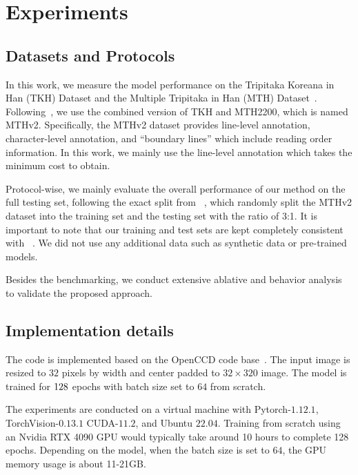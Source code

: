
\section{Experiments}

\subsection{Datasets and Protocols}
In this work, we measure the model performance on the Tripitaka Koreana in Han (TKH) Dataset and the Multiple Tripitaka in Han (MTH) Dataset~\cite{tkhmth}. Following~\cite{jla},
we use the combined version of TKH and MTH2200, which is named MTHv2. Specifically, the MTHv2 dataset provides line-level annotation, character-level annotation, and ``boundary lines'' which include reading order information. In this work, we mainly use the line-level annotation which takes the minimum cost to obtain. 

Protocol-wise, we mainly evaluate the overall performance of our method on the full testing set, following the exact split from ~\cite{jla}, which randomly split the MTHv2 dataset into the training set and the testing set with the ratio of 3:1. It is important to note that our training and test sets are kept completely consistent with ~\cite{jla}. We did not use any additional data such as synthetic data or pre-trained models.


Besides the benchmarking, we conduct extensive ablative and behavior analysis to validate the proposed approach.


\subsection{Implementation details}
The code is implemented based on the OpenCCD code base~\cite{vsdf}. The input image is resized to $32$ pixels by width and center padded to $32\times 320$ image. The model is trained for $128$ epochs with batch size set to $64$ from scratch. %

The experiments are conducted on a virtual machine with Pytorch-$1.12.1$, TorchVision-$0.13.1$ CUDA-$11.2$, and Ubuntu $22.04$. Training from scratch using an Nvidia RTX 4090 GPU would typically take around 10 hours to complete 128 epochs. Depending on the model, when the batch size is set to $64$, the GPU memory usage is about 11-21GB.


